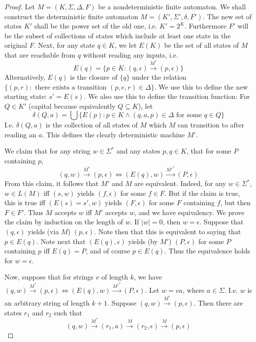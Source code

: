 \documentclass{article}
\theoremstyle{definition}
\theoremstyle{plain}
\theoremstyle{theorem}
\begin{document}
\begin{proof}
	Let $M=(K,\Sigma,\Delta,F)$ be a nondeterministic finite automaton. We shall construct the deterministic finite automaton $M=(K',\Sigma',\delta,F')$. The new set of states $K'$ shall be the power set of the old one, i.e. $K'=2^K$. Furthermore $F'$ will be the subset of collections of states which include at least one state in the original $F$. Next, for any state $q \in K$, we let $E(K)$ be the set of all states of $M$ that are reachable from $q$ without reading any inputs, i.e.
	\[ E(q) = \{p \in K: (q,\epsilon) \overset{M^*}{\to} (p,\epsilon)\} \]
Alternatively, $E(q)$ is the closure of $\{q\}$ under the relation $\{(p,r): \textrm{ there exists a transition } (p,e,r) \in \Delta \}$. We use this to define the new starting state: $s' = E(s)$. We also use this to define the transition function: For $Q \in K'$ (capital because equivalently $Q \subseteq K$), let 
\[ \delta(Q,a) = \bigcup\{ E(p): p \in K \wedge (q,a,p)\in \Delta \textrm{ for some }q\in Q \} \] 
I.e. $\delta(Q,a)$ is the collection of all states of $M$ which $M$ can transition to after reading an $a$. This defines the clearly deterministic machine $M'$.
\par We claim that for any string $w \in \Sigma^*$ and any states $p,q \in K$, that for some $P$ containing $p$,  
\[ (q,w) \overset{M^*}{\to} (p,\epsilon) \iff (E(q),w) \overset{M'^*}{\to} (P,\epsilon) \]
From this claim, it follows that $M'$ and $M$ are equivalent. Indeed, for any $w \in \Sigma^*$, $w \in L(M)$ iff $(s,w)$ yields $(f,\epsilon)$ for some $f \in F$. But if the claim is true, this is true iff $(E(s)=s',w)$ yields $(F,\epsilon)$ for some $F$ containing $f$, but then $F \in F'$. Thus $M$ accepts $w$ iff $M'$ accepts $w$, and we have equivalency. We prove the claim by induction on the length of $w$. If $|w| = 0$, then $w = \epsilon$. Suppose that $(q,\epsilon)$ yields (via $M$) $(p,\epsilon)$. Note then that this is equivalent to saying that $p \in E(q)$. Note next that $(E(q),\epsilon)$ yields (by $M'$) $(P,\epsilon)$ for some $P$ containing $p$ iff $E(q) = P$, and of course $p \in E(q)$. Thus the equivalence holds for $w = \epsilon$.
\par Now, suppose that for strings $v$ of length $k$, we have $(q,w) \overset{M^*}{\to} (p,\epsilon) \iff (E(q),w) \overset{M'^*}{\to} (P,\epsilon)$. Let $w = va$, where $a \in \Sigma$. I.e. $w$ is an arbitrary string of length $k+1$. Suppose $(q,w) \overset{M^*}{\to} (p,\epsilon)$. Then there are states $r_1$ and $r_2$ such that
\[ (q,w) \overset{M^*}{\to} (r_1,a) \overset{M}{\to} (r_2,\epsilon) \overset{M}{\to} (p,\epsilon) \]

\end{proof}
\end{document}
